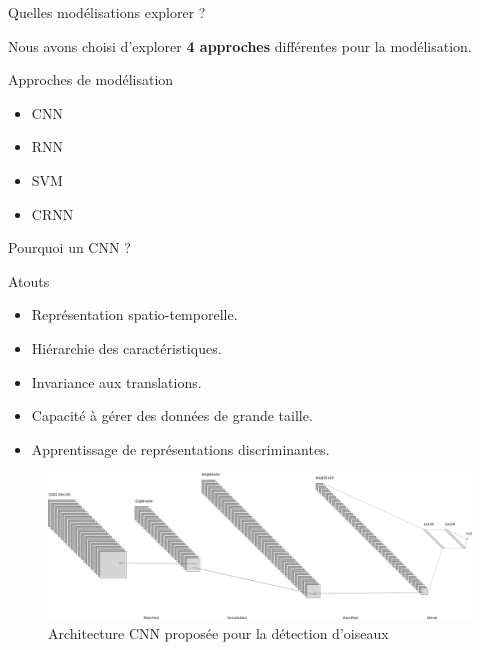 \documentclass[compress,xcolor=table]{beamer}
\begin{document}
\begin{frame}{Quelles modélisations explorer ?}

    Nous avons choisi d'explorer \textbf{4 approches} différentes pour la modélisation.

    \begin{block}{Approches de modélisation}
        \begin{itemize}
            \item CNN
            \item RNN
            \item SVM
            \item CRNN
        \end{itemize}
    \end{block}



\end{frame}

\begin{frame}{Pourquoi un CNN ? }

    \begin{block}{Atouts}
        \begin{itemize}
            \item Représentation spatio-temporelle.
            \item Hiérarchie des caractéristiques.
            \item Invariance aux translations.
            \item Capacité à gérer des données de grande taille.
            \item Apprentissage de représentations discriminantes.
        \end{itemize}
    \end{block}

    \begin{figure}
        \includegraphics[width=\textwidth,keepaspectratio]{../images/models/CNN.architecture.png}
        \caption{Architecture CNN proposée pour la détection d'oiseaux}
        \label{fig:CNN.architecture.birds}
    \end{figure}

\end{frame}
\end{document}
